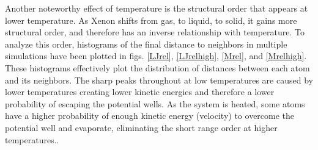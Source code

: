 \documentclass[12pt]{article}
\begin{document}
Another noteworthy effect of temperature is the structural order that appears at lower temperature.  As Xenon shifts from gas, to liquid, to solid, it gains more structural order, and therefore has an inverse relationship with temperature.  To analyze this order, histograms of the final distance to neighbors in multiple simulations have been plotted in figs. \ref{LJrel}, \ref{LJrelhigh}, \ref{Mrel}, and \ref{Mrelhigh}.  These histograms effectively plot the distribution of distances between each atom and its neighbors. The sharp peaks throughout at low temperatures are caused by lower temperatures creating lower kinetic energies and therefore a lower probability of escaping the potential wells.  As the system is heated, some atoms have a higher probability of enough kinetic energy (velocity) to overcome the potential well and evaporate, eliminating the short range order at higher temperatures..
\end{document}
